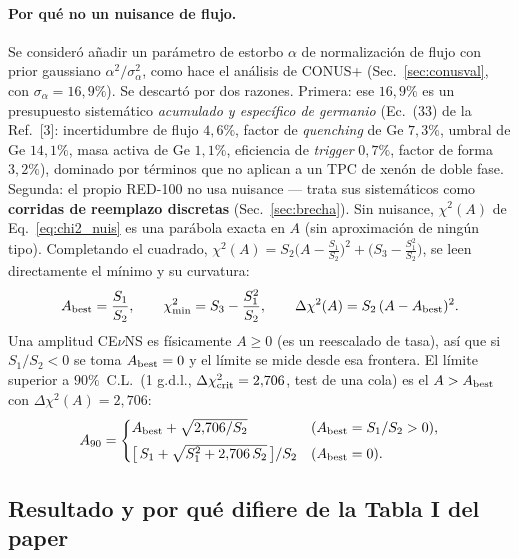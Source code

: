 \documentclass[11pt,a4paper]{article}
\begin{document}
\paragraph{Por qu\'e no un nuisance de flujo.} Se consider\'o a\~nadir un
par\'ametro de estorbo $\alpha$ de normalizaci\'on de flujo con prior gaussiano
$\alpha^{2}/\sigma_{\alpha}^{2}$, como hace el an\'alisis de CONUS+
(Sec.~\ref{sec:conusval}, con $\sigma_{\alpha}=16{,}9\%$). Se descart\'o por dos
razones. Primera: ese $16{,}9\%$ es un presupuesto sistem\'atico \emph{acumulado
y espec\'ifico de germanio} (Ec.~(33) de la Ref.~[3]: incertidumbre de flujo
$4{,}6\%$, factor de \emph{quenching} de Ge $7{,}3\%$, umbral de Ge $14{,}1\%$,
masa activa de Ge $1{,}1\%$, eficiencia de \emph{trigger} $0{,}7\%$, factor de
forma $3{,}2\%$), dominado por t\'erminos que no aplican a un TPC de xen\'on de
doble fase. Segunda: el propio RED-100 no usa nuisance --- trata sus
sistem\'aticos como \textbf{corridas de reemplazo discretas}
(Sec.~\ref{sec:brecha}). Sin nuisance, $\chi^{2}(A)$ de Eq.~\eqref{eq:chi2_nuis}
es una par\'abola exacta en $A$ (sin aproximaci\'on de ning\'un tipo). Completando
el cuadrado, $\chi^{2}(A)=S_{2}\bigl(A-\tfrac{S_{1}}{S_{2}}\bigr)^{2} +
\bigl(S_{3}-\tfrac{S_{1}^{2}}{S_{2}}\bigr)$, se leen directamente el m\'inimo y
su curvatura:
\begin{equation}
  \label{eq:A90_1d}
  A_{\rm best} = \frac{S_{1}}{S_{2}},
  \qquad
  \chi^{2}_{\min} = S_{3} - \frac{S_{1}^{2}}{S_{2}},
  \qquad
  \Delta\chi^{2}(A) = S_{2}\,(A-A_{\rm best})^{2}.
\end{equation}
Una amplitud CE$\nu$NS es f\'isicamente $A\ge 0$ (es un reescalado de tasa), as\'i
que si $S_{1}/S_{2}<0$ se toma $A_{\rm best}=0$ y el l\'imite se mide desde esa
frontera. El l\'imite superior a $90\%$~C.L.\ (1 g.d.l.,
$\Delta\chi^{2}_{\rm crit}=2{,}706$, test de una cola) es el $A>A_{\rm best}$ con
$\Delta\chi^{2}(A)=2{,}706$:
\begin{equation}
  \label{eq:A90_solve}
  A_{90} =
  \begin{cases}
    A_{\rm best} + \sqrt{2{,}706/S_{2}} & (A_{\rm best}=S_{1}/S_{2}>0),\\[4pt]
    \bigl[\,S_{1} + \sqrt{S_{1}^{2} + 2{,}706\,S_{2}}\,\bigr]/S_{2}
      & (A_{\rm best}=0).
  \end{cases}
\end{equation}

\subsection{Resultado y por qu\'e difiere de la Tabla I del paper}
\label{sec:xe_res}
\end{document}
